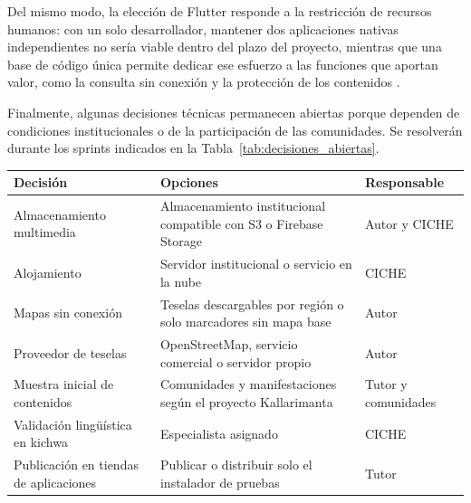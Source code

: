 Del mismo modo, la elección de Flutter responde a la restricción de recursos humanos: con un solo desarrollador, mantener dos aplicaciones nativas independientes no sería viable dentro del plazo del proyecto, mientras que una base de código única permite dedicar ese esfuerzo a las funciones que aportan valor, como la consulta sin conexión y la protección de los contenidos \cite{flutter2026docs,biorn2019cross}.

Finalmente, algunas decisiones técnicas permanecen abiertas porque dependen de condiciones institucionales o de la participación de las comunidades. Se resolverán durante los sprints indicados en la Tabla~\ref{tab:decisiones_abiertas}.

{\centering\singlespacing
  \label{tab:decisiones_abiertas}
  \begin{tabular}{|p{}|p{}|p{}|}
    \hline
    \textbf{Decisión} & \textbf{Opciones} & \textbf{Responsable} \tabularnewline
    \hline
    \raggedright\hspace{0pt}Almacenamiento multimedia & \raggedright\hspace{0pt}Almacenamiento institucional compatible con S3 o Firebase Storage & \raggedright\hspace{0pt}Autor y CICHE \tabularnewline
    \hline
    \raggedright\hspace{0pt}Alojamiento & \raggedright\hspace{0pt}Servidor institucional o servicio en la nube & \raggedright\hspace{0pt}CICHE \tabularnewline
    \hline
    \raggedright\hspace{0pt}Mapas sin conexión & \raggedright\hspace{0pt}Teselas descargables por región o solo marcadores sin mapa base & \raggedright\hspace{0pt}Autor \tabularnewline
    \hline
    \raggedright\hspace{0pt}Proveedor de teselas & \raggedright\hspace{0pt}OpenStreetMap, servicio comercial o servidor propio & \raggedright\hspace{0pt}Autor \tabularnewline
    \hline
    \raggedright\hspace{0pt}Muestra inicial de contenidos & \raggedright\hspace{0pt}Comunidades y manifestaciones según el proyecto Kallarimanta & \raggedright\hspace{0pt}Tutor y comunidades \tabularnewline
    \hline
    \raggedright\hspace{0pt}Validación lingüística en kichwa & \raggedright\hspace{0pt}Especialista asignado & \raggedright\hspace{0pt}CICHE \tabularnewline
    \hline
    \raggedright\hspace{0pt}Publicación en tiendas de aplicaciones & \raggedright\hspace{0pt}Publicar o distribuir solo el instalador de pruebas & \raggedright\hspace{0pt}Tutor \tabularnewline
    \hline
  \end{tabular}\par}
